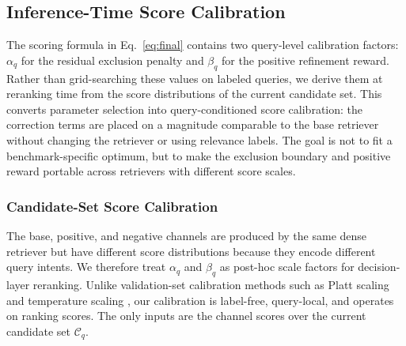 \documentclass[letterpaper]{article}
\begin{document}
\subsection{Inference-Time Score Calibration}
\label{sec:parameter-derivation}

The scoring formula in Eq.~\ref{eq:final} contains two query-level
calibration factors: $\alpha_q$ for the residual exclusion penalty and
$\beta_q$ for the positive refinement reward.  Rather than
grid-searching these values on labeled queries, we derive them at
reranking time from the score distributions of the current candidate
set.  This converts parameter selection into query-conditioned score
calibration: the correction terms are placed on a magnitude comparable
to the base retriever without changing the retriever or using relevance
labels.  The goal is not to fit a benchmark-specific optimum, but to
make the exclusion boundary and positive reward portable across
retrievers with different score scales.

\subsubsection{Candidate-Set Score Calibration}
\label{sec:scale-alignment}

The base, positive, and negative channels are produced by the same dense
retriever but have different score distributions because they encode
different query intents.  We therefore treat $\alpha_q$ and $\beta_q$
as post-hoc scale factors for decision-layer reranking.  Unlike
validation-set calibration methods such as Platt scaling and
temperature scaling
\cite{platt1999probabilistic,guo2017temperature}, our calibration is
label-free, query-local, and operates on ranking scores.  The only
inputs are the channel scores over the current candidate set
$\mathcal{C}_q$.
\end{document}
